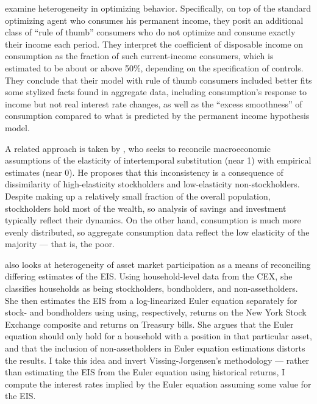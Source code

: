 \cite{campbell89} examine heterogeneity in optimizing behavior. Specifically, on top of the standard optimizing agent who consumes his permanent income, they posit an additional class of ``rule of thumb'' consumers who do not optimize and consume exactly their income each period. They interpret the coefficient of disposable income on consumption as the fraction of such current-income consumers, which is estimated to be about or above 50\%, depending on the specification of controls. They conclude that their model with rule of thumb consumers included better fits some stylized facts found in aggregate data, including consumption's response to income but not real interest rate changes, as well as the ``excess smoothness'' of consumption compared to what is predicted by the permanent income hypothesis model.

A related approach is taken by \cite{guvenen06}, who seeks to reconcile macroeconomic assumptions of the elasticity of intertemporal substitution (near 1) with empirical estimates (near 0). He proposes that this inconsistency is a consequence of dissimilarity of high-elasticity stockholders and low-elasticity non-stockholders. Despite making up a relatively small fraction of the overall population, stockholders hold most of the wealth, so analysis of savings and investment typically reflect their dynamics. On the other hand, consumption is much more evenly distributed, so aggregate consumption data reflect the low elasticity of the majority --- that is, the poor. 

\cite{vissing02} also looks at heterogeneity of asset market participation as a means of reconciling differing estimates of the EIS. Using household-level data from the CEX, she classifies households as being stockholders, bondholders, and non-assetholders. She then estimates the EIS from a log-linearized Euler equation separately for stock- and bondholders using using, respectively, returns on the New York Stock Exchange composite and returns on Treasury bills. She argues that the Euler equation should only hold for a household with a position in that particular asset, and that the inclusion of non-assetholders in Euler equation estimations distorts the results. I take this idea and invert Vissing-Jorgensen's methodology --- rather than estimating the EIS from the Euler equation using historical returns, I compute the interest rates implied by the Euler equation assuming some value for the EIS.
